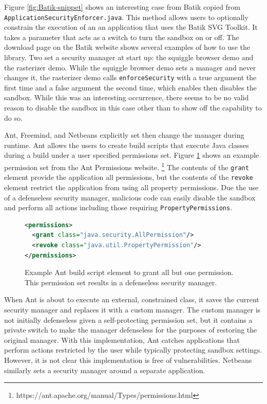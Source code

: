 \documentclass{sig-alternate}
\begin{document}
Figure \ref{fig:Batik-snippet} shows an interesting case from Batik
copied from \texttt{ApplicationSecurityEnforcer.java}. This method
allows users to optionally constrain the execution of an an application
that uses the Batik SVG Toolkit. It takes a parameter that acts as
a switch to turn the sandbox on or off. The download page on the Batik
website shows several examples of how to use the library. Two set
a security manager at start up: the squiggle browser demo and the
rasterizer demo. While the squiggle browser demo sets a manager and
never changes it, the rasterizer demo calls \texttt{enforceSecurity}
with a true argument the first time and a false argument the second
time, which enables then disables the sandbox. While this was an interesting
occurrence, there seems to be no valid reason to disable the sandbox
in this case other than to show off the capability to do so.

Ant, Freemind, and Netbeans explicitly set then change the manager
during runtime. Ant allows the users to create build scripts that
execute Java classes during a build under a user specified
permissions set. Figure \ref{fig:Ant Permissions Example}
shows an example permission set from the Ant Permissions website.%
\footnote{https://ant.apache.org/manual/Types/permissions.html%
} The contents of the \texttt{grant} element provide the application
all permissions, but the contents of the \texttt{revoke} element restrict
the application from using all property permissions. Due the use of a
defenseless security manager, malicious code can easily disable the sandbox and perform all actions
including those requiring \texttt{PropertyPermissions}.

\begin{figure}
\begin{lstlisting}[language=XML,basicstyle={\scriptsize}]
<permissions>   
  <grant class="java.security.AllPermission"/>   
  <revoke class="java.util.PropertyPermission"/> 
</permissions>
\end{lstlisting}

\caption{Example Ant build script element to grant all but one permission.
This permission set results in a defenseless security manager.}
\label{fig:Ant Permissions Example}
\end{figure}

When Ant is about to execute an external, constrained class, it saves the current security manager and replaces it with a custom manager. The custom manager is not initially defenseless given a self-protecting permission set, but it contains a private switch to make the manager defenseless for the purposes of restoring the original manager. With this implementation, Ant catches applications that perform actions
restricted by the user while typically protecting sandbox settings. However, it is not clear this implementation
is free of vulnerabilities. Netbeans similarly sets a security manager around a separate application.
\end{document}
